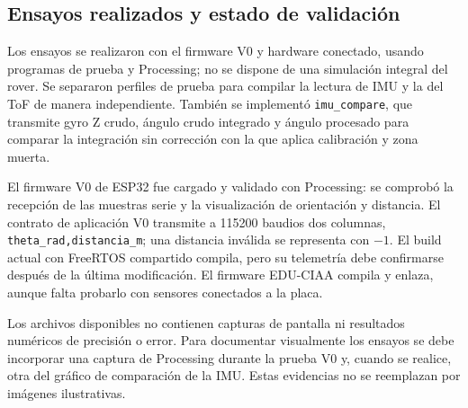 \subsection{Ensayos realizados y estado de validación}

Los ensayos se realizaron con el firmware V0 y hardware conectado, usando
programas de prueba y Processing; no se dispone de una simulación integral del
rover. Se separaron perfiles de prueba para compilar la lectura de IMU y la del
ToF de manera independiente. También se implementó \texttt{imu\_compare}, que
transmite gyro Z crudo, ángulo crudo integrado y ángulo procesado para comparar
la integración sin corrección con la que aplica calibración y zona muerta.

El firmware V0 de ESP32 fue cargado y validado con Processing: se comprobó la
recepción de las muestras serie y la visualización de orientación y distancia.
El contrato de aplicación V0 transmite a 115200 baudios dos columnas,
\texttt{theta\_rad,distancia\_m}; una distancia inválida se representa con
$-1$. El build actual con FreeRTOS compartido compila, pero su telemetría debe
confirmarse después de la última modificación. El firmware EDU-CIAA compila y
enlaza, aunque falta probarlo con sensores conectados a la placa.

Los archivos disponibles no contienen capturas de pantalla ni resultados
numéricos de precisión o error. Para documentar visualmente los ensayos se debe
incorporar una captura de Processing durante la prueba V0 y, cuando se realice,
otra del gráfico de comparación de la IMU. Estas evidencias no se reemplazan
por imágenes ilustrativas.
